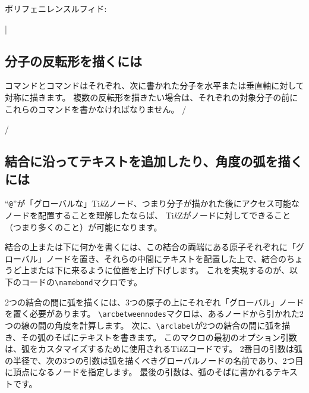 \documentclass[10pt]{ltjsarticle}
\makeatletter
\newcommand\make@car@active[1]{%
	\catcode`#1\active
	\begingroup
		\lccode`\~`#1\relax
		\lowercase{\endgroup\def~}%
}
\newif\if@exstar
\newcommand\exemple{%
	\begingroup
	\parskip\smallskipamount
	\@makeother\;\@makeother\!\@makeother\?\@makeother\:%
	\@ifstar{\@exstartrue\exemple@}{\@exstarfalse\exemple@}}
\newcommand\exemple@[2][65]{%
	\medbreak\noindent
	\begingroup
		\let\do\@makeother\dospecials
		\make@car@active\ { {}}%
		\make@car@active\^^M{\par\leavevmode}%
		\make@car@active\^^I{\space\space}%
		\make@car@active\,{\leavevmode\kern\z@\string,}%
		\make@car@active\-{\leavevmode\kern\z@\string-}%
		\make@car@active\>{\leavevmode\kern\z@\string>}%
		\make@car@active\<{\leavevmode\kern\z@\string<}%
		\exemple@@{#1}{#2}%
}
\newcommand\exemple@@[3]{%
	\def\@tempa##1#3{\exemple@@@{#1}{#2}{##1}}%
	\@tempa
}
\newcommand\exemple@@@[3]{%
	\xdef\the@code{#3}%
	\endgroup
	\if@exstar
		\begingroup
			\fboxrule0.4pt
			\let\breakboxparindent\z@
			\def\bkvz@bottom{\hrule\@height\fboxrule}%
			\let\bkvz@before@breakbox\relax
			\def\bkvz@set@linewidth{\advance\linewidth\dimexpr-2\fboxrule-2\fboxsep}%
			\def\bkvz@left{\vrule\@width\fboxrule\hskip\fboxsep}%
			\def\bkvz@right{\hskip\fboxsep\vrule\@width\fboxrule}%
			\def\bkvz@top{\hbox to \hsize{%
				\vrule\@width\fboxrule\@height\fboxrule
				\leaders\bkvz@bottom\hfill
				\sffamily
				\fboxsep\z@
				\colorbox{black}{\kern0.25em\color{white}\footnotesize\lower0.5ex\hbox{\strut#2}\kern0.25em}%
				\leaders\bkvz@bottom\hfill
				\vrule\@width\fboxrule\@height\fboxrule}}%
			\breakbox
				\kern.5ex\relax
				\ltjsetparameter{autoxspacing=false, autospacing=false}
				\ttfamily\footnotesize\the@code\par
				\normalfont
				\kern3pt
				\hrule height0.1pt width\linewidth depth0.1pt
				\vskip5pt
				\rightskip0pt plus 1fill
				\everypar{{\color{lightgray}\rlap{\vrule height0.1pt width\linewidth depth0.1pt}}\hskip0pt plus 1fill}%
				\newlinechar`\^^M\everyeof{\noexpand}\scantokens{#3}\par
			\endbreakbox
		\endgroup
	\else
		\vskip0.5ex
		\boxput*(0,1)
			{\fboxsep\z@
			\hbox{\sffamily\colorbox{black}{\leavevmode\kern0.25em{\color{white}\footnotesize\strut#2}\kern0.25em}}%
			}%
			{\fboxsep5pt
			\fbox{%
				$\vcenter{\hsize\dimexpr0.#1\linewidth-\fboxsep-\fboxrule\relax
					\kern5pt\parskip0pt%
                                        \ltjsetparameter{autoxspacing=false, autospacing=false}%
                                        \ttfamily\footnotesize\the@code}%
				\vcenter{\kern5pt\hsize\dimexpr\linewidth-0.#1\linewidth-\fboxsep-\fboxrule\relax
					\everypar{{\color{lightgray}\rlap{\vrule height0.1pt width\dimexpr\linewidth-0.#1\linewidth-\fboxsep-\fboxrule depth0.1pt}}}%
					\footnotesize\newlinechar`\^^M\everyeof{\noexpand}\scantokens{#3}}$%
				}%
			}%
	\fi
	\medbreak
	\endgroup
}
\newcommand\falseverb[1]{{\ttfamily\detokenize\expandafter{\string#1}}}
\newcommand\TIKZ{Ti\textit kZ\xspace}
\makeatother
\begin{document}
ポリフェニレンスルフィド:
\bigskip


|

\subsection{分子の反転形を描くには}\label{retournement}

\falseverb{\hflipnext}コマンドと\falseverb{\vflipnext}コマンドはそれぞれ、次に書かれた分子を水平または垂直軸に対して対称に描きます。
複数の反転形を描きたい場合は、それぞれの対象分子の前にこれらのコマンドを書かなければなりません。
\exemple{反転形}/%

\vflipnext
{}\medskip

\hflipnext
{}/

\subsection{結合に沿ってテキストを追加したり、角度の弧を描くには}

``\verb-@-''が「グローバルな」\TIKZ{}ノード、つまり分子が描かれた後にアクセス可能なノードを配置することを理解したならば、
\TIKZ{}がノードに対してできること（つまり多くのこと）が可能になります。

結合の上または下に何かを書くには、この結合の両端にある原子それぞれに「グローバル」ノードを置き、それらの中間にテキストを配置した上で、結合のちょうど上または下に来るように位置を上げ下げします。
これを実現するのが、以下のコードの\verb-\namebond-マクロです。

2つの結合の間に弧を描くには、3つの原子の上にそれぞれ「グローバル」ノードを置く必要があります。
\verb-\arcbetweennodes-マクロは、あるノードから引かれた2つの線の間の角度を計算します。
次に、\verb-\arclabel-が2つの結合の間に弧を描き、その弧のそばにテキストを書きます。
このマクロの最初のオプション引数は、弧をカスタマイズするために使用される\TIKZ{}コードです。
2番目の引数は弧の半径で、次の3つの引数は弧を描くべきグローバルノードの名前であり、2つ目に頂点になるノードを指定します。
最後の引数は、弧のそばに書かれるテキストです。
\end{document}
